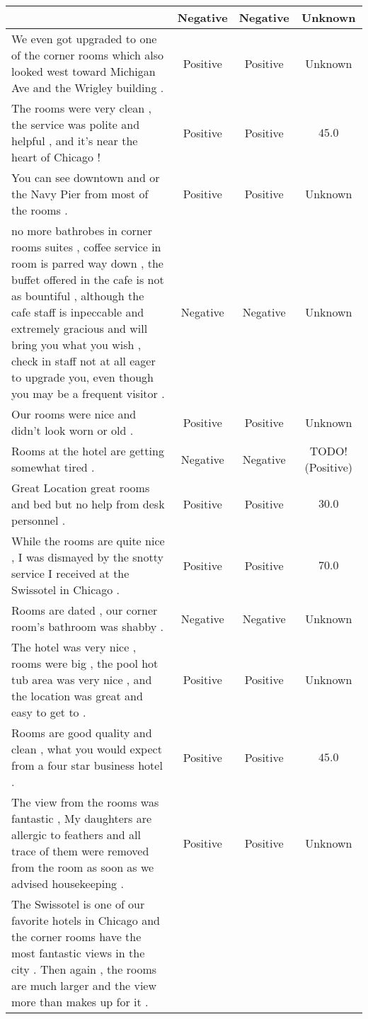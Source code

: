 \begin{landscape}
\begin{center}
\begin{longtable}{m{9cm}ccc}
& Negative & Negative & Unknown \\ \hline
We even got upgraded to one of the corner rooms which also looked west toward Michigan Ave and the Wrigley building .
& Positive & Positive & Unknown \\ \hline
The rooms were very clean , the service was polite and helpful , and it's near the heart of Chicago !
& Positive & Positive & $45.0$ \\ \hline
You can see downtown and or the Navy Pier from most of the rooms .
& Positive & Positive  & Unknown \\ \hline
no more bathrobes in corner rooms suites , coffee service in room is parred way down , the buffet offered in the cafe is not as bountiful , although the cafe staff is inpeccable and extremely gracious and will bring you what you wish , check in staff not at all eager to upgrade you, even though you may be a frequent visitor .
& Negative & Negative  & Unknown \\ \hline
Our rooms were nice and didn't look worn or old .
& Positive & Positive  & Unknown \\ \hline
Rooms at the hotel are getting somewhat tired .
& Negative & Negative & TODO! (Positive)\\ \hline
Great Location great rooms and bed but no help from desk personnel .
& Positive & Positive & $30.0$ \\ \hline
While the rooms are quite nice , I was dismayed by the snotty service I received at the Swissotel in Chicago .
& Positive & Positive & $70.0$ \\ \hline
Rooms are dated , our corner room's bathroom was shabby .
& Negative & Negative & Unknown \\ \hline
The hotel was very nice , rooms were big , the pool hot tub area was very nice , and the location was great and easy to get to .
& Positive & Positive & Unknown \\ \hline
Rooms are good quality and clean , what you would expect from a four star business hotel .
& Positive & Positive & $45.0$ \\ \hline
The view from the rooms was fantastic , My daughters are allergic to feathers and all trace of them were removed from the room as soon as we advised housekeeping .
& Positive & Positive & Unknown \\ \hline
The Swissotel is one of our favorite hotels in Chicago and the corner rooms have the most fantastic views in the city .
Then again , the rooms are much larger and the view more than makes up for it .

\end{longtable}
\end{center}
\end{landscape}
